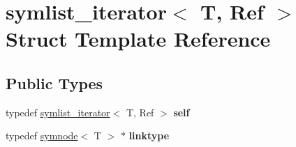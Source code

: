 \hypertarget{structsymlist__iterator}{}\section{symlist\+\_\+iterator$<$ T, Ref $>$ Struct Template Reference}
\label{structsymlist__iterator}
\subsection*{Public Types}
\begin{DoxyCompactItemize}
\item 
\mbox{\label{structsymlist__iterator_ae1426e0085d4c88445c0a84675ee7d38}} 
typedef \mbox{\hyperlink{structsymlist__iterator}{symlist\+\_\+iterator}}$<$ T, Ref $>$ {\bfseries self}
\item 
\mbox{\label{structsymlist__iterator_ad9462ba519f8ca01ea64e04e25ee3750}} 
typedef \mbox{\hyperlink{structsymnode}{symnode}}$<$ T $>$ $\ast$ {\bfseries linktype}
\end{DoxyCompactItemize}
